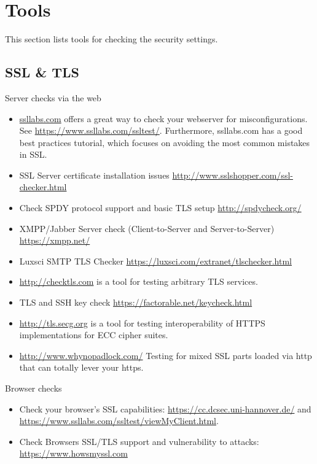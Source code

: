\chapter{Tools}
\label{cha:tools}
This section lists tools for checking the security settings.

\section{SSL \& TLS}

Server checks via the web
\begin{itemize}
  \item \href{http://ssllabs.com}{ssllabs.com} offers a great way to check your webserver for misconfigurations. See \url{https://www.ssllabs.com/ssltest/}. Furthermore, ssllabs.com has a good best practices tutorial, which focuses on avoiding the most common mistakes in SSL.
  \item SSL Server certificate installation issues \url{http://www.sslshopper.com/ssl-checker.html}
  \item Check SPDY protocol support and basic TLS setup \url{http://spdycheck.org/}
  \item XMPP/Jabber Server check (Client-to-Server and Server-to-Server) \url{https://xmpp.net/}
  \item Luxsci SMTP TLS Checker \url{https://luxsci.com/extranet/tlschecker.html}
  \item \url{http://checktls.com} is a tool for testing arbitrary TLS services.
  \item TLS and SSH key check \url{https://factorable.net/keycheck.html}
  \item \url{http://tls.secg.org} is a tool for testing interoperability of HTTPS implementations for ECC cipher suites.
  \item \url{http://www.whynopadlock.com/} Testing for mixed SSL parts loaded via http that can totally lever your https.
\end{itemize}

Browser checks
\begin{itemize}
  \item Check your browser's SSL capabilities: \url{https://cc.dcsec.uni-hannover.de/} and \url{https://www.ssllabs.com/ssltest/viewMyClient.html}.
  \item Check Browsers SSL/TLS support and vulnerability to attacks: \url{https://www.howsmyssl.com}
\end{itemize}


